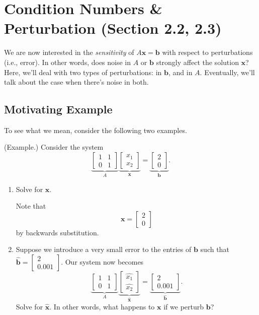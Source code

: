 \documentclass[letterpaper]{article}
\newcommand{\0}{\mathbf{0}}
\renewcommand{\b}{\mathbf{b}}
\newcommand{\x}{\mathbf{x}}
\begin{document}
\section{Condition Numbers \& Perturbation (Section 2.2, 2.3)}
We are now interested in the \emph{sensitivity} of $A\x = \b$ with respect to perturbations (i.e., error). In other words, does noise in $A$ or $\b$ strongly affect the solution $\x$? Here, we'll deal with two types of perturbations: in $\b$, and in $A$. Eventually, we'll talk about the case when there's noise in both. 

\subsection{Motivating Example}
To see what we mean, consider the following two examples.
\begin{mdframed}
    (Example.) Consider the system 
    \[\underbrace{\begin{bmatrix}
        1 & 1 \\ 0 & 1 
    \end{bmatrix}}_A \underbrace{\begin{bmatrix}
        x_1 \\ x_2
    \end{bmatrix}}_{\x} = \underbrace{\begin{bmatrix}
        2 \\ 0
    \end{bmatrix}}_{\b}.\]

    \begin{enumerate}
        \item Solve for $\x$. 
        \begin{mdframed}
            Note that \[\x = \begin{bmatrix}
                2 \\ 0
            \end{bmatrix}\] by backwards substitution.
        \end{mdframed}

        \item Suppose we introduce a very small error to the entries of $\b$ such that $\hat{\b} = \begin{bmatrix}
            2 \\ 0.001
        \end{bmatrix}.$ Our system now becomes \[\underbrace{\begin{bmatrix}
            1 & 1 \\ 0 & 1 
        \end{bmatrix}}_A \underbrace{\begin{bmatrix}
            \hat{x_1} \\ \hat{x_2}
        \end{bmatrix}}_{\hat{\x}} = \underbrace{\begin{bmatrix}
            2 \\ 0.001
        \end{bmatrix}}_{\hat{\b}}.\] Solve for $\hat{\x}$. In other words, what happens to $\x$ if we perturb $\b$?  


\end{enumerate}
\end{mdframed}
\end{document}
